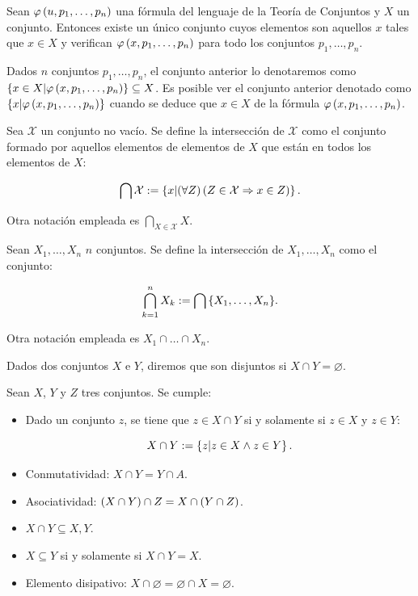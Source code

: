 \begin{proposition}
  \rm Sean $\varphi\left(u,p_1, \dots,p_n\right)$ una fórmula del lenguaje de la Teoría de Conjuntos y $X$ un conjunto. Entonces existe un único conjunto cuyos elementos son aquellos $x$ tales que $x\in X$ y verifican $\varphi\left(x,p_1,\dots,p_n\right)$ para todo los conjuntos $p_1,\dots,p_n$. 
  
  Dados $n$ conjuntos $p_1,\dots,p_n$, el conjunto anterior lo denotaremos como $\left\{x\in X\middle|\varphi\left(x,p_1,\dots,p_n\right)\right\}\subseteq X$. Es posible ver el conjunto anterior denotado como $\left\{x\middle|\varphi\left(x,p_1,\dots,p_n\right)\right\}$ cuando se deduce que $x\in X$ de la fórmula $\varphi\left(x,p_1,\dots,p_n\right)$.
\end{proposition}


\begin{definition}
  \rm Sea $\mathcal{X}$ un conjunto no vacío. Se define la intersección de $\mathcal{X}$ como el conjunto formado por aquellos elementos de elementos de $X$ que están en todos los elementos de $X$:

  \begin{equation}
    \bigcap{\mathcal{X}}:=\left\{x\middle|\left(\forall Z\right)\left(Z\in\mathcal{X}\Rightarrow x\in Z\right)\right\}.
  \end{equation}

  Otra notación empleada es $\displaystyle\bigcap_{X\in\mathcal{X}}{X}$.

  Sean $X_1,\dots,X_n$ $n$ conjuntos. Se define la intersección de $X_1,\dots,X_n$ como el conjunto:

  \begin{equation}
    \bigcap_{k=1}^{n}{X_k}:=\bigcap{\left\{X_1,\dots,X_n\right\}}.
  \end{equation}

  Otra notación empleada es $X_1\cap\dots\cap X_n$.

  Dados dos conjuntos $X$ e $Y$, diremos que son disjuntos si $X\cap Y=\varnothing$.
\end{definition}

\begin{proposition}
\rm Sean $X$, $Y$ y $Z$ tres conjuntos. Se cumple:

\begin{itemize}
    \item[1.] Dado un conjunto $z$, se tiene que $z\in X\cap Y$ si y solamente si $z\in X$ y $z\in Y$:
    
    \begin{equation}
      X\cap Y:=\left\{z\middle|z\in X\land z\in Y\right\}.
    \end{equation}
    \item[2.] Conmutatividad: $X\cap Y=Y\cap A$.
    \item[3.] Asociatividad: $\left(X\cap Y\right)\cap Z=X\cap\left(Y\cap Z\right)$.
    \item[4.] $X\cap Y\subseteq X,Y$.
    \item[5.] $X\subseteq Y$ si y solamente si $X\cap Y=X$.
    \item[6.] Elemento disipativo: $X\cap\varnothing=\varnothing\cap X=\varnothing$.
\end{itemize}
\end{proposition}

